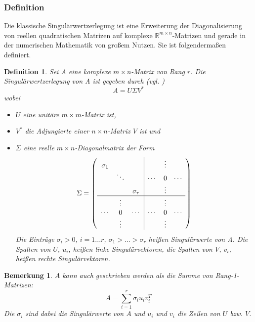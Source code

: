 \documentclass[12pt,a4paper,twoside]{article}
\newtheorem{Definition}[Satz]{Definition}
\newtheorem{Bemerkung}{Bemerkung}
\begin{document}
		\subsubsection{Definition}
		Die klassische Singulärwertzerlegung ist eine Erweiterung der Diagonalisierung von reellen quadratischen 
		Matrizen auf komplexe $\mathds{R}^{m\times n}$-Matrizen und gerade in der numerischen Mathematik von großem 
		Nutzen. Sie ist folgendermaßen definiert.		
		\begin{Definition}
		Sei A eine komplexe $m\times n$-Matrix von Rang $r$. Die Singulärwertzerlegung von A ist gegeben durch (vgl. 			\cite{deuflhard2008})
		\begin{equation*}
			\label{eq:SVD}
			A=U\Sigma V^* 
		\end{equation*}
		wobei
		\begin{itemize}
			\item $U$ eine unitäre $m\times m$-Matrix ist,
			\item $V^*$ die Adjungierte einer $n\times n$-Matrix $V$ ist und
			\item $\Sigma$ eine reelle $m\times n$-Diagonalmatrix der Form \[
	 		\Sigma = \left(\begin{array}{ccc|ccc}
					\sigma_1 &          &         &       & \vdots &       \\
         			& \ddots   &         & \cdots & 0      & \cdots \\
         			&      &\sigma_r &        & \vdots &        \\
					\hline
        			 &  \vdots  &        &       & \vdots &        \\
					\cdots   & 0       & \cdots   & \cdots & 0      & \cdots \\
        			 &  \vdots  &         &        & \vdots &        \\
					\end{array}\right)
			\]
			Die Einträge $\sigma_i>0$, $i=1...r$, $\sigma_1>...>\sigma_r$ heißen Singulärwerte von A. Die Spalten von $U$, $u_i$, heißen linke Singulärvektoren, die Spalten von $V$, $v_i$, heißen rechte Singulärvektoren.
		\end{itemize}
		\end{Definition}
		\begin{Bemerkung}
			$A$ kann auch geschrieben werden als die Summe von Rang-1-Matrizen:
			\begin{equation*}
				\label{eq:SVDsum}
				A=\sum_{i=1}^r\sigma_i u_i v_i^T
			\end{equation*}
			Die $\sigma_i$ sind dabei die Singulärwerte von $A$ und $u_i$ und $v_i$ die Zeilen von $U$ bzw. $V$.
		\end{Bemerkung}
\end{document}

